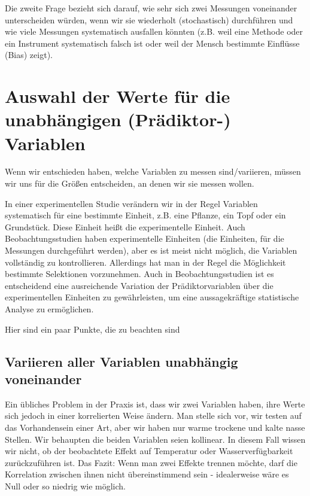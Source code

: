\documentclass[a4paper,twoside]{tufte-book}\usepackage[]{graphicx}\usepackage[]{color}
\begin{document}
Die zweite Frage bezieht sich darauf, wie sehr sich zwei Messungen voneinander unterscheiden würden, wenn wir sie wiederholt (stochastisch) durchführen und wie viele Messungen systematisch ausfallen könnten (z.B. weil eine Methode oder ein Instrument systematisch falsch ist oder weil der Mensch bestimmte Einflüsse (Bias) zeigt).


\section{Auswahl der Werte für die unabhängigen (Prädiktor-) Variablen}

Wenn wir entschieden haben, welche Variablen zu messen sind/variieren, müssen wir uns für die Größen entscheiden, an denen wir sie messen wollen.

In einer experimentellen Studie verändern wir in der Regel Variablen systematisch für eine bestimmte Einheit, z.B. eine Pflanze, ein Topf oder ein Grundstück. Diese Einheit heißt die experimentelle Einheit. Auch Beobachtungsstudien haben experimentelle Einheiten (die Einheiten, für die Messungen durchgeführt werden), aber es ist meist nicht möglich, die Variablen vollständig zu kontrollieren. Allerdings hat man in der Regel die Möglichkeit bestimmte Selektionen vorzunehmen. Auch in Beobachtungsstudien ist es entscheidend eine ausreichende Variation der Prädiktorvariablen über die experimentellen Einheiten zu gewährleisten, um eine aussagekräftige statistische Analyse zu ermöglichen.

Hier sind ein paar Punkte, die zu beachten sind

\subsection{Variieren aller Variablen unabhängig voneinander}

Ein übliches Problem in der Praxis ist, dass wir zwei Variablen haben, ihre Werte sich jedoch in einer korrelierten Weise ändern. Man stelle sich vor, wir testen auf das Vorhandensein einer Art, aber wir haben nur warme trockene und kalte nasse Stellen. Wir behaupten die beiden Variablen seien kollinear. In diesem Fall wissen wir nicht, ob der beobachtete Effekt auf Temperatur oder Wasserverfügbarkeit zurückzuführen ist. Das Fazit: Wenn man zwei Effekte trennen möchte, darf die Korrelation zwischen ihnen nicht übereinstimmend sein - idealerweise wäre es Null oder so niedrig wie möglich. 
\end{document}
